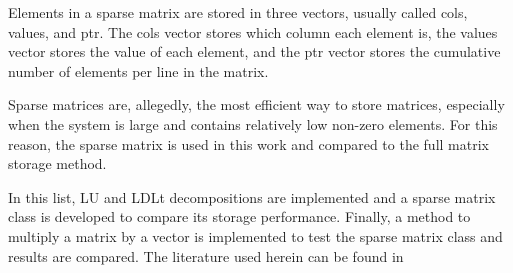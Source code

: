 Elements in a sparse matrix are stored in three vectors, usually called cols, values, and ptr. The cols vector stores which column each element is, the values vector stores the value of each element, and the ptr vector stores the cumulative number of elements per line in the matrix.

Sparse matrices are, allegedly, the most efficient way to store matrices, especially when the system is large and contains relatively low non-zero elements. For this reason, the sparse matrix is used in this work and compared to the full matrix storage method.

In this list, LU and LDLt decompositions are implemented and a sparse matrix class is developed to compare its storage performance. Finally, a method to multiply a matrix by a vector is implemented to test the sparse matrix class and results are compared. The literature used herein can be found in \cite{de2000metodos,golub2013matrix,strang2022introduction,jennings1977matrix}